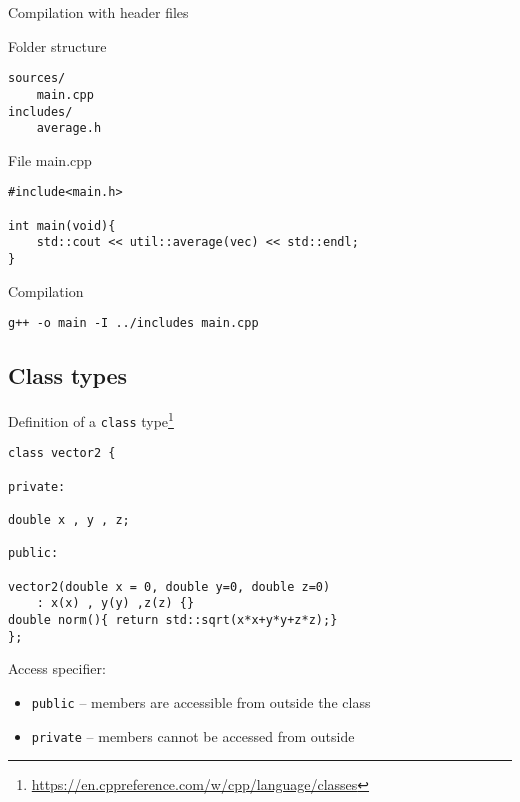 \documentclass[12pt,t]{beamer}
\begin{document}
\begin{frame}[fragile]{Compilation with header files}

\begin{block}{Folder structure}
\begin{lstlisting}
sources/
    main.cpp
includes/
    average.h
\end{lstlisting}
\end{block}

\begin{block}{File main.cpp}
\begin{lstlisting}
#include<main.h>

int main(void){
    std::cout << util::average(vec) << std::endl;
}
\end{lstlisting}
\end{block}

\begin{block}{Compilation}
\begin{lstlisting}
g++ -o main -I ../includes main.cpp
\end{lstlisting}
\end{block}

\end{frame}



\subsection{Class types}

\begin{frame}[fragile]{Definition of a \lstinline|class| type\footnote{\tiny\url{https://en.cppreference.com/w/cpp/language/classes}}}

\begin{lstlisting}
class vector2 {

private:

double x , y , z;

public:

vector2(double x = 0, double y=0, double z=0)
	: x(x) , y(y) ,z(z) {}
double norm(){ return std::sqrt(x*x+y*y+z*z);}
};
\end{lstlisting}


\begin{block}{Access specifier:}
\begin{itemize}
\item \lstinline|public| --  members are accessible from outside the class
\item \lstinline|private| -- members cannot be accessed from outside 
\end{itemize}

\end{block}


\end{frame}
\end{document}
